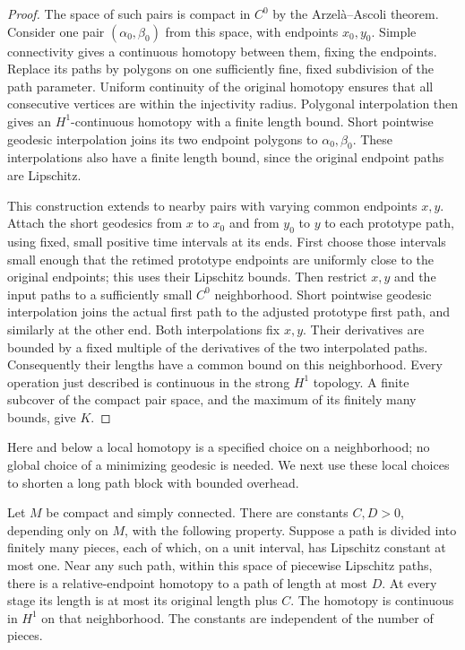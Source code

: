 \begin{proof}
The space of such pairs is compact in $C^0$ by the Arzel\`a--Ascoli
theorem.  Consider one pair $(\alpha_0,\beta_0)$ from this space, with
endpoints $x_0,y_0$.  Simple connectivity gives a continuous homotopy
between them, fixing the endpoints.  Replace its paths by polygons on one
sufficiently fine, fixed subdivision of the path parameter.  Uniform
continuity of the original homotopy ensures that all consecutive vertices
are within the injectivity radius.  Polygonal interpolation then gives an
$H^1$-continuous homotopy with a finite length bound.  Short pointwise
geodesic interpolation joins its two endpoint polygons to
$\alpha_0,\beta_0$.  These interpolations also have a finite length
bound, since the original endpoint paths are Lipschitz.

This construction extends to nearby pairs with varying common endpoints
$x,y$.  Attach the short geodesics from $x$ to $x_0$ and from $y_0$ to $y$
to each prototype path, using fixed, small positive time intervals at its
ends.  First choose those intervals small enough that the retimed
prototype endpoints are uniformly close to the original endpoints; this
uses their Lipschitz bounds.  Then restrict $x,y$ and the input paths to
a sufficiently small $C^0$ neighborhood.  Short pointwise geodesic
interpolation joins the actual first path to the adjusted prototype first
path, and similarly at the other end.  Both interpolations fix $x,y$.
Their derivatives are bounded by a fixed multiple of the derivatives of
the two interpolated paths.  Consequently their lengths have a common
bound on this neighborhood.  Every operation just described is continuous
in the strong $H^1$ topology.  A finite subcover of the compact pair space,
and the maximum of its finitely many bounds, give $K$.
\end{proof}

Here and below a local homotopy is a specified choice on a neighborhood;
no global choice of a minimizing geodesic is needed.  We next use these
local choices to shorten a long path block with bounded overhead.

\begin{lemma}\label{lem:shortening-block}
Let $M$ be compact and simply connected.
There are constants $C,D>0$, depending only on $M$, with the following
property.  Suppose a path is divided into finitely many pieces, each of
which, on a unit interval, has Lipschitz constant at most one.  Near any
such path, within this space of piecewise Lipschitz paths, there is a
relative-endpoint homotopy to a path of length at
most $D$.  At every stage its length is at most its original length plus
$C$.  The homotopy is continuous in $H^1$ on that neighborhood.  The
constants are independent of the number of pieces.
\end{lemma}

